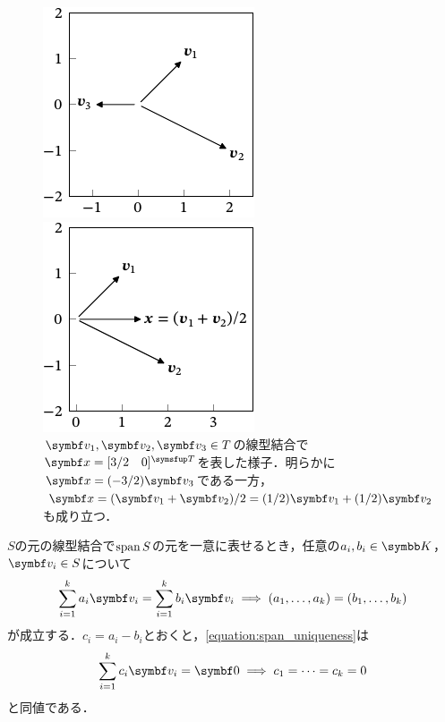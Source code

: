 \documentclass[../../main]{subfiles}
\begin{document}
\begin{figure}[htbp]
  \centering
  \begin{minipage}{\linewidth/2}
    \centering
    \includegraphics{linear_comb1.pdf}
  \end{minipage}%
  \begin{minipage}{\linewidth/2}
    \centering
    \includegraphics{linear_comb2.pdf}    
  \end{minipage}
  \caption{\(\vect{v}_1,\vect{v}_2,\vect{v}_3\in T\)の線型結合で\(\vect{x}=\trps{[\begin{matrix}3/2 & 0\end{matrix}]}\)を表した様子．明らかに\(\vect{x}=(-3/2)\vect{v}_3\)である一方，\(\vect{x}=(\vect{v}_1+\vect{v}_2)/2=(1/2)\vect{v}_1+(1/2)\vect{v}_2\)も成り立つ．}
  \label{figure:linear_comb}
\end{figure}

\(S\)の元の線型結合で\(\operatorname{span} S\)の元を一意に表せるとき，任意の\(a_i,b_i\in\numset{K}\)，\(\vect{v}_i\in S\)について
\begin{equation}
  \label{equation:span_uniqueness}
  \sum_{i=1}^ka_i\vect{v}_i = \sum_{i=1}^kb_i\vect{v}_i
  \implies (a_1,\dots,a_k) = (b_1,\dots,b_k)
\end{equation}
が成立する．\(c_i=a_i-b_i\)とおくと，\cref{equation:span_uniqueness}は
\begin{equation}
  \label{equation:independence}
  \sum_{i=1}^kc_i\vect{v}_i = \zvec
  \implies c_1 = \dots = c_k = 0
\end{equation}
と同値である．
\end{document}
